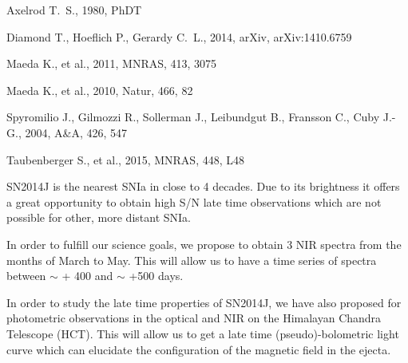 \documentclass[11pt]{article}
\begin{document}
\begin{thebibliography}{99}
Axelrod T.~S., 1980, PhDT 

 Diamond T., Hoeflich P., Gerardy C.~L., 2014, arXiv, arXiv:1410.6759 


Maeda K., et al., 2011, MNRAS, 413, 3075 

Maeda K., et al., 2010, Natur, 466, 82 

 Spyromilio J., Gilmozzi R., Sollerman J., Leibundgut B., Fransson C., Cuby J.-G., 2004, A\&A, 426, 547 


 Taubenberger S., et al., 2015, MNRAS, 448, 
L48 


\end{thebibliography}


%

\expdesign    %
SN2014J is the nearest SNIa in close to 4 decades. Due to its brightness it offers a great opportunity to obtain high S/N late time observations which are not possible for other, more distant SNIa.

In order to fulfill our science goals, we propose to obtain 3 NIR spectra from the months of March to May. This will allow us to have  a time series of spectra between $\sim$ + 400 and $\sim$ +500 days. 


In order to study the late time properties of SN2014J, we have also proposed for photometric observations in the optical and NIR on the Himalayan Chandra Telescope (HCT). This will allow us to get a late time (pseudo)-bolometric light curve which can elucidate the configuration of the magnetic field in the ejecta. 
\end{document}
